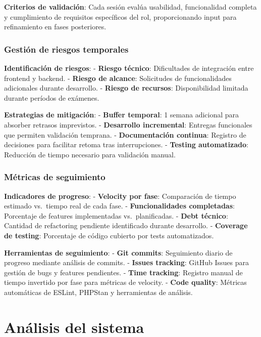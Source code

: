 \documentclass[12pt,a4paper,oneside]{report}
\begin{document}
\textbf{Criterios de validación}: Cada sesión evalúa usabilidad,
funcionalidad completa y cumplimiento de requisitos específicos del rol,
proporcionando input para refinamiento en fases posteriores.

\subsection{Gestión de riesgos
temporales}\label{gestiuxf3n-de-riesgos-temporales}

\textbf{Identificación de riesgos}: - \textbf{Riesgo técnico}:
Dificultades de integración entre frontend y backend. - \textbf{Riesgo
de alcance}: Solicitudes de funcionalidades adicionales durante
desarrollo. - \textbf{Riesgo de recursos}: Disponibilidad limitada
durante períodos de exámenes.

\textbf{Estrategias de mitigación}: - \textbf{Buffer temporal}: 1 semana
adicional para absorber retrasos imprevistos. - \textbf{Desarrollo
incremental}: Entregas funcionales que permiten validación temprana. -
\textbf{Documentación continua}: Registro de decisiones para facilitar
retoma tras interrupciones. - \textbf{Testing automatizado}: Reducción
de tiempo necesario para validación manual.

\subsection{Métricas de seguimiento}\label{muxe9tricas-de-seguimiento}

\textbf{Indicadores de progreso}: - \textbf{Velocity por fase}:
Comparación de tiempo estimado vs.~tiempo real de cada fase. -
\textbf{Funcionalidades completadas}: Porcentaje de features
implementadas vs.~planificadas. - \textbf{Debt técnico}: Cantidad de
refactoring pendiente identificado durante desarrollo. -
\textbf{Coverage de testing}: Porcentaje de código cubierto por tests
automatizados.

\textbf{Herramientas de seguimiento}: - \textbf{Git commits}:
Seguimiento diario de progreso mediante análisis de commits. -
\textbf{Issues tracking}: GitHub Issues para gestión de bugs y features
pendientes. - \textbf{Time tracking}: Registro manual de tiempo
invertido por fase para métricas de velocity. - \textbf{Code quality}:
Métricas automáticas de ESLint, PHPStan y herramientas de análisis.

\chapter{Análisis del sistema}\label{anuxe1lisis-del-sistema}
\end{document}
